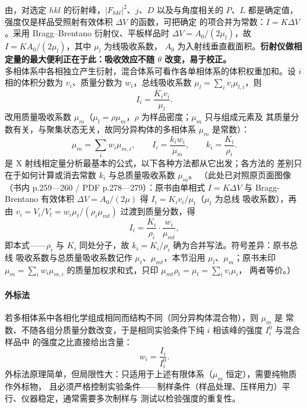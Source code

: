 \begin{principle}
由，对选定 $hkl$ 的衍射峰，$\left|F_{hkl}\right|^{2}$、$j$、$D$
以及与角度相关的 $P$、$L$ 都是确定值，强度仅是样品受照射有效体积 $\Delta V$ 的函数，可把确定
的项合并为常数：$I=K\Delta V$。采用 Bragg--Brentano 衍射仪、平板样品时
$\Delta V=A_{0}/(2\mu_{l})$，故 $I=KA_{0}/(2\mu_{l})$，其中 $\mu_{l}$ 为线吸收系数，
$A_{0}$ 为入射线垂直截面积。\textbf{衍射仪做相定量的最大便利正在于此：吸收效应不随 $\theta$
改变，易于校正。}\\
多相体系中各相独立产生衍射，混合体系可看作各单相体系的体积权重加和。设 $i$ 相的体积分数为
$v_{i}$、质量分数为 $w_{i}$，总线吸收系数 $\mu_{l}=\sum_{i}v_{i}\mu_{l,i}$，则
\begin{equation}
I_{i}=\frac{K_{i}v_{i}}{\mu_{l}} .
\label{eq:ch04b-Ii-V}
\end{equation}
改用质量吸收系数 $\mu_{m}$（$\mu_{l}=\rho\mu_{m}$，$\rho$ 为样品密度；$\mu_{m}$ 只与组成元素及
其质量分数有关，与聚集状态无关，故同分异构体的多相体系 $\mu_{m}$ 是常数）：
\begin{equation}
\mu_{m}=\sum_{i}w_{i}\mu_{m,i},\qquad
I_{i}=\frac{k_{i}w_{i}}{\mu_{m}},\qquad k_{i}=\frac{K_{i}}{\rho_{i}} .
\label{eq:ch04b-Ii-w}
\end{equation}
 是 X 射线相定量分析最基本的公式，以下各种方法都从它出发；各方法的
差别只在于如何计算或消去常数 $k_{i}$ 与总质量吸收系数 $\mu_{m}$。
（此处已对照原页面图像（书内 p.259—260 / PDF p.278—279）：原书由单相式 $I=K\Delta V$ 与
Bragg-Brentano 有效体积 $\Delta V=A_{0}/(2\mu)$ 得 $I_{i}=K_{i}v_{i}/\mu_{t}$（$\mu_{t}$ 为总线
吸收系数），再由 $v_{i}=V_{i}/V_{t}=w_{i}\mu_{t}/(\rho_{i}\mu_{mt})$ 过渡到质量分数，得
\[ I_{i}=\frac{K_{i}}{\rho_{i}}\cdot\frac{w_{i}}{\mu_{mt}}, \]
即本式——$\rho_{i}$ 与 $K_{i}$ 同处分子，故 $k_{i}=K_{i}/\rho_{i}$ 确为合并写法。符号差异：原书总线
吸收系数与总质量吸收系数记作 $\mu_{t}$、$\mu_{mt}$，本节沿用 $\mu_{l}$、$\mu_{m}$；原书未印
$\mu_{m}=\sum_{i}w_{i}\mu_{m,i}$ 的质量加权求和式，只印 $\mu_{mt}\rho_{t}=\mu_{t}=\sum_{i}v_{i}\mu_{i}$，
两者等价。）
\end{principle}

\paragraph{外标法}若多相体系中各相化学组成相同而结构不同（同分异构体混合物），则 $\mu_{m}$ 是
常数、不随各组分质量分数改变，于是相同实验条件下纯 $i$ 相该峰的强度 $I_{i}^{0}$ 与混合样品中
的强度之比直接给出含量：
\begin{equation}
w_{i}=\frac{I_{i}}{I_{i}^{0}} .
\label{eq:ch04b-external}
\end{equation}
外标法原理简单，但局限性大：只适用于上述有限体系（$\mu_{m}$ 恒定），需要纯物质作外标物，
且必须严格控制实验条件——制样条件（样品处理、压样用力）平行、仪器稳定，通常需要多次制样与
测试以检验强度的重复性。

